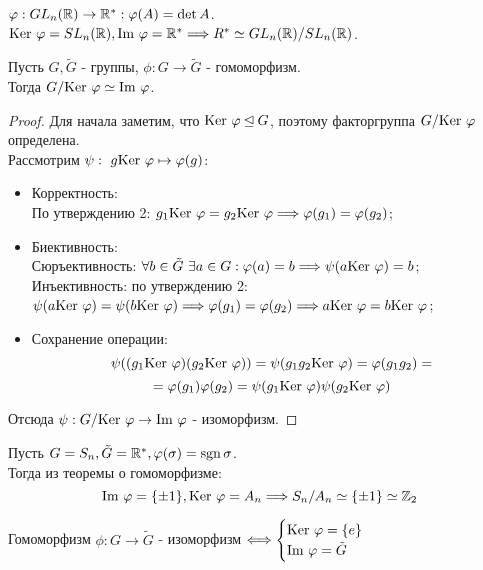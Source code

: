 \begin{example}
    $\phi: GL_n(\R) \rightarrow \R^* : \phi(A) = \det A$.\\
    $\textup{Ker }\phi = SL_n(\R), \textup{Im }\phi = \R^* \Longrightarrow R^* \simeq GL_n(\R) / SL_n(\R)$.
\end{example}
\begin{theorem}[О гомоморфизме]
    Пусть $G, \tilde{G}$ - группы, $\phi: G \rightarrow \tilde{G}$ - гомоморфизм.\\
    Тогда $G / \textup{Ker }\phi \simeq \textup{Im } \phi$.
\end{theorem}
\begin{proof}
    Для начала заметим, что $\textup{Ker } \phi \unlhd G$, поэтому факторгруппа $G / \textup{Ker }\phi$ определена.\\
    Рассмотрим $\psi: \ g \textup{Ker }\phi \mapsto \phi(g)$:
    \begin{itemize}
        \item Корректность:\\
        По утверждению 2: $g_1 \textup{Ker }\phi = g_2 \textup{Ker }\phi \Longrightarrow \phi(g_1) = \phi(g_2)$;
        \item Биективность:\\
        Сюръективность: $\forall b \in \tilde{G} \ \exists a \in G: \phi(a) = b \Longrightarrow \psi(a \textup{Ker }\phi) = b$;\\
        Инъективность: по утверждению 2: $\psi(a \textup{Ker }\phi) = \psi(b \textup{Ker }\phi) \Longrightarrow \phi(g_1) = \phi(g_2) \Longrightarrow a \textup{Ker }\phi = b \textup{Ker }\phi$;
        \item Сохранение операции:
        \[\psi((g_1 \textup{Ker }\phi)(g_2 \textup{Ker }\phi)) = \psi(g_1g_2 \textup{Ker }\phi) = \phi(g_1g_2) =\]
        \[ = \phi(g_1)\phi(g_2) = \psi(g_1 \textup{Ker }\phi)\psi(g_2 \textup{Ker }\phi)\]
    \end{itemize}
    Отсюда $\psi: G/\textup{Ker }\phi \rightarrow \textup{Im }\phi$ - изоморфизм.
\end{proof}
\begin{example}
    Пусть $G = S_n, \tilde{G} = \R^*, \phi(\sigma) = \sgn \sigma$.\\
    Тогда из теоремы о гомоморфизме: 
    \[\textup{Im }\phi = \{\pm 1\}, \textup{Ker }\phi = A_n \Longrightarrow S_n / A_n \simeq \{\pm 1\} \simeq \Z_2\]
\end{example}
\begin{consequensenum}
    Гомоморфизм $\phi: G \rightarrow \tilde{G}$ - изоморфизм $\Longleftrightarrow \begin{cases}
        \textup{Ker }\phi = \{e\}\\
        \textup{Im }\phi = \tilde{G}
    \end{cases}$
\end{consequensenum}
